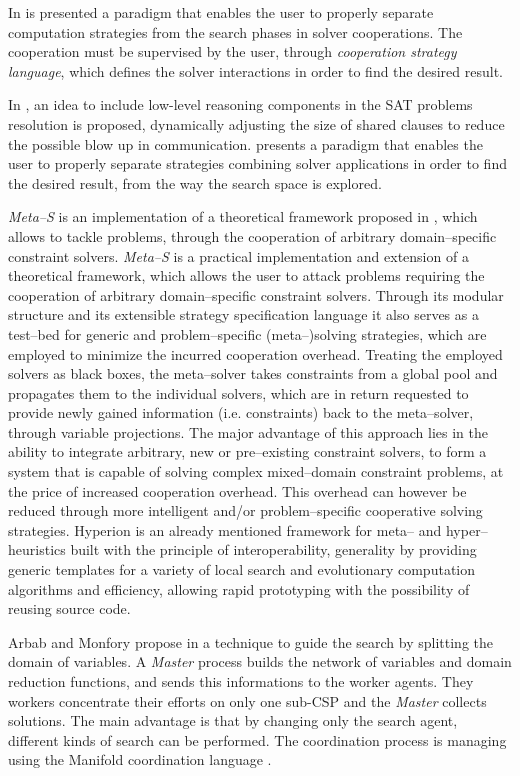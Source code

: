 In \cite{Pajot2003} is presented a paradigm that enables the user to properly separate computation strategies from the search phases in solver cooperations. The cooperation must be supervised by the user, through {\it cooperation strategy language}, which defines the solver interactions in order to find the desired result.

In \cite{Hamadi2012}, an idea to include low-level reasoning components in the SAT problems resolution is proposed, dynamically adjusting the size of shared clauses to reduce the possible blow up in communication. \cite{Pajot2003} presents a paradigm that enables the user to properly separate strategies combining solver applications in order to find the desired result, from the way the search space is explored. 

{\it Meta--S} is an implementation of a theoretical framework proposed in \cite{Frank2003}, which allows to tackle problems, through the cooperation of arbitrary domain--specific constraint solvers. {\it Meta--S} \cite{Frank2003} is a practical implementation and extension of a theoretical framework, which allows the user to attack problems requiring the cooperation of arbitrary domain--specific constraint solvers. Through its modular structure and its extensible strategy specification language it also serves as a test--bed for generic and problem--specific (meta--)solving strategies, which are employed to minimize the incurred cooperation overhead. Treating the employed solvers as black boxes, the meta--solver takes constraints from a global pool and propagates them to the individual solvers, which are in return requested to provide newly gained information (i.e. constraints) back to the meta--solver, through variable projections. The major advantage of this approach lies in the ability to integrate arbitrary, new or pre--existing constraint solvers, to form a system that is capable of solving complex mixed--domain constraint problems, at the price of increased cooperation overhead. This overhead can however be reduced through more intelligent and/or problem--specific cooperative solving strategies. {\sc Hyperion} \cite{Brownlee2014} is an already mentioned framework for meta-- and hyper--heuristics built with the principle of interoperability, generality by providing generic templates for a variety of local search and evolutionary computation algorithms and efficiency, allowing rapid prototyping with the possibility of reusing source code.

Arbab and Monfory propose in \cite{Arbab2000} a technique to guide the search by splitting the domain of variables. A \textit{Master} process builds the network of variables and domain reduction functions, and sends this informations to the worker agents. They workers concentrate their efforts on only one sub-CSP and the \textit{Master} collects solutions. The main advantage is that by changing only the search agent, different kinds of search can be performed. The coordination process is managing using the {\sc Manifold} coordination language \cite{Arbab1995}.

